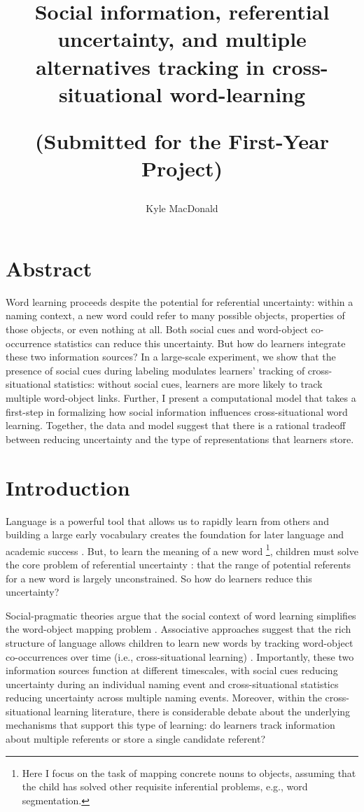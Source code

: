 \documentclass[man]{apa2}
\title{Social information, referential uncertainty, and multiple alternatives tracking in cross-situational word-learning

(Submitted for the First-Year Project)}
\author{Kyle MacDonald}
\affiliation{Department of Psychology, Stanford University}
\begin{document}
\maketitle


\section{Abstract}

Word learning proceeds despite the potential for referential uncertainty: within a naming context, a new word could refer to many possible objects, properties of those objects, or even nothing at all. Both social cues and word-object co-occurrence statistics can reduce this uncertainty. But how do learners integrate these two information sources? In a large-scale experiment, we show that the presence of social cues during labeling modulates learners' tracking of cross-situational statistics: without social cues, learners are more likely to track multiple word-object links. Further, I present a computational model that takes a first-step in formalizing how social information influences cross-situational word learning. Together, the data and model suggest that there is a rational tradeoff between reducing uncertainty and the type of representations that learners store.  

\newpage


\section{Introduction}
Language is a powerful tool that allows us to rapidly learn from others and building a large early vocabulary creates the foundation for later language and academic success \cite{hart1995meaningful, qian2002investigating}. But, to learn the meaning of a new word \footnote{Here I focus on the task of mapping concrete nouns to objects, assuming that the child has solved other requisite inferential problems, e.g., word segmentation.}, children must solve the core problem of referential uncertainty \cite{quine19600}: that the range of potential referents for a new word is largely unconstrained. So how do learners reduce this uncertainty?

Social-pragmatic theories argue that the social context of word learning simplifies the word-object mapping problem \cite{bloom2002children, tomasello2009constructing}. Associative approaches suggest that the rich structure of language allows children to learn new words by tracking word-object co-occurrences over time (i.e., cross-situational learning) \cite{smith2008infants}. Importantly, these two information sources function at different timescales, with social cues reducing uncertainty during an individual naming event and cross-situational statistics reducing uncertainty across multiple naming events. Moreover, within the cross-situational learning literature, there is considerable debate about the underlying mechanisms that support this type of learning: do learners track information about multiple referents or store a single candidate referent?
\end{document}
